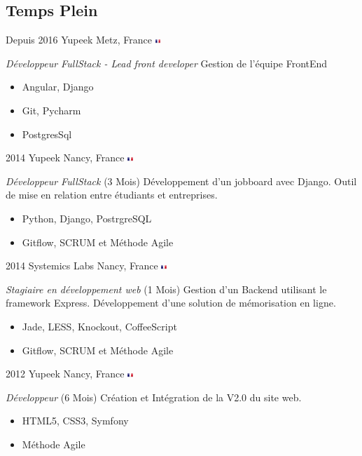 \documentclass[]{friggeri-cv} %
\begin{document}
\subsection{Temps Plein}
\begin{entrylist}
\entry
{Depuis 2016}
{Yupeek}
{Metz, France {\includegraphics[height=0.2cm]{./flags/fr.png}}}
{\textit{Développeur FullStack - Lead front developer}\newline
Gestion de l'équipe FrontEnd
\begin{itemize}
\item Angular, Django
\item Git, Pycharm
\item PostgresSql
\end{itemize}}
\entry
{2014}
{Yupeek}
{Nancy, France {\includegraphics[height=0.2cm]{./flags/fr.png}}}
{\textit{Développeur FullStack} (3 Mois)\newline
Développement d'un jobboard avec Django.\newline
Outil de mise en relation entre étudiants et entreprises.
\begin{itemize}
\item Python, Django, PostrgreSQL
\item Gitflow, SCRUM et Méthode Agile
\end{itemize}}
\entry
{2014}
{Systemics Labs}
{Nancy, France {\includegraphics[height=0.2cm]{./flags/fr.png}}}
{\textit{Stagiaire en développement web} (1 Mois)\newline
Gestion d'un Backend utilisant le framework Express.\newline
Développement d'une solution de mémorisation en ligne.
\begin{itemize}
\item Jade, LESS, Knockout, CoffeeScript
\item Gitflow, SCRUM et Méthode Agile
\end{itemize}}
\entry
{2012}
{Yupeek}
{Nancy, France {\includegraphics[height=0.2cm]{./flags/fr.png}}}
{\emph{Développeur} (6 Mois)\newline
Création et Intégration de la V2.0 du site web.
\begin{itemize}
\item HTML5, CSS3, Symfony
\item Méthode Agile
\end{itemize}}
\end{entrylist}
\end{document}
